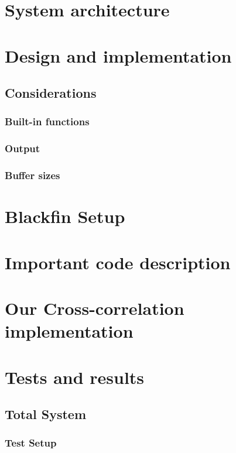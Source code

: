 \section{System architecture}

\section{Design and implementation}

\subsection{Considerations}
\subsubsection{Built-in functions}
\subsubsection{Output}
\subsubsection{Buffer sizes}

\section{Blackfin Setup}

\section{Important code description}

\section{Our Cross-correlation implementation}


\section{Tests and results}
\subsection{Total System}
\subsubsection{Test Setup}
